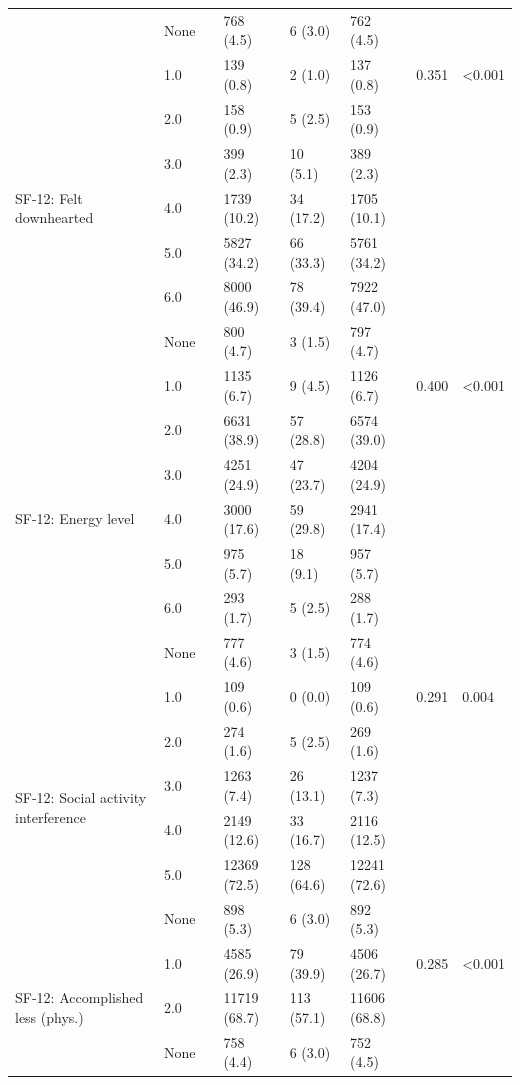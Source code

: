 \begin{tabular}{llllllll}
 & None &  & 768 (4.5) & 6 (3.0) & 762 (4.5) &  &  \\
\cline{1-8}
\multirow[t]{7}{*}{SF-12: Felt downhearted} & 1.0 &  & 139 (0.8) & 2 (1.0) & 137 (0.8) & 0.351 & <0.001 \\
 & 2.0 &  & 158 (0.9) & 5 (2.5) & 153 (0.9) &  &  \\
 & 3.0 &  & 399 (2.3) & 10 (5.1) & 389 (2.3) &  &  \\
 & 4.0 &  & 1739 (10.2) & 34 (17.2) & 1705 (10.1) &  &  \\
 & 5.0 &  & 5827 (34.2) & 66 (33.3) & 5761 (34.2) &  &  \\
 & 6.0 &  & 8000 (46.9) & 78 (39.4) & 7922 (47.0) &  &  \\
 & None &  & 800 (4.7) & 3 (1.5) & 797 (4.7) &  &  \\
\cline{1-8}
\multirow[t]{7}{*}{SF-12: Energy level} & 1.0 &  & 1135 (6.7) & 9 (4.5) & 1126 (6.7) & 0.400 & <0.001 \\
 & 2.0 &  & 6631 (38.9) & 57 (28.8) & 6574 (39.0) &  &  \\
 & 3.0 &  & 4251 (24.9) & 47 (23.7) & 4204 (24.9) &  &  \\
 & 4.0 &  & 3000 (17.6) & 59 (29.8) & 2941 (17.4) &  &  \\
 & 5.0 &  & 975 (5.7) & 18 (9.1) & 957 (5.7) &  &  \\
 & 6.0 &  & 293 (1.7) & 5 (2.5) & 288 (1.7) &  &  \\
 & None &  & 777 (4.6) & 3 (1.5) & 774 (4.6) &  &  \\
\cline{1-8}
\multirow[t]{6}{*}{SF-12: Social activity interference} & 1.0 &  & 109 (0.6) & 0 (0.0) & 109 (0.6) & 0.291 & 0.004 \\
 & 2.0 &  & 274 (1.6) & 5 (2.5) & 269 (1.6) &  &  \\
 & 3.0 &  & 1263 (7.4) & 26 (13.1) & 1237 (7.3) &  &  \\
 & 4.0 &  & 2149 (12.6) & 33 (16.7) & 2116 (12.5) &  &  \\
 & 5.0 &  & 12369 (72.5) & 128 (64.6) & 12241 (72.6) &  &  \\
 & None &  & 898 (5.3) & 6 (3.0) & 892 (5.3) &  &  \\
\cline{1-8}
\multirow[t]{3}{*}{SF-12: Accomplished less (phys.)} & 1.0 &  & 4585 (26.9) & 79 (39.9) & 4506 (26.7) & 0.285 & <0.001 \\
 & 2.0 &  & 11719 (68.7) & 113 (57.1) & 11606 (68.8) &  &  \\
 & None &  & 758 (4.4) & 6 (3.0) & 752 (4.5) &  &  \\
\cline{1-8}

\end{tabular}
